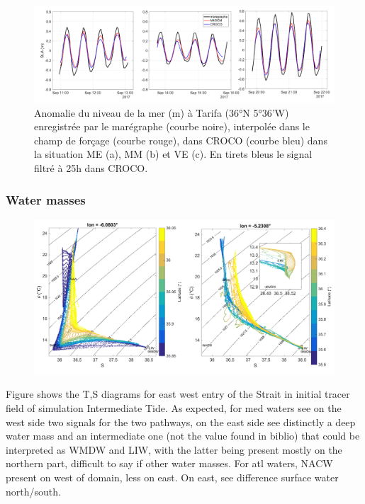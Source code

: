 \begin{figure}[!h]
        \includegraphics[width=\textwidth]{./GBR3D/SLA_Tarifa_ME2VE2IES.png}
        \caption{Anomalie du niveau de la mer (m) à Tarifa (36°N 5°36'W) enregistrée par le marégraphe  (courbe noire),
        interpolée dans le champ de forçage (courbe rouge), dans CROCO (courbe bleu) dans la situation ME (a), MM (b) et VE (c).
        En tirets bleus le signal filtré à 25h dans CROCO.}
        \label{fig_maree_tar}
\end{figure}

\subsubsection{Water masses}


\begin{figure}[!h]
        \includegraphics[width=\textwidth]{./GBR3D/WM_ini_IES.png}
        \caption{}
\end{figure}


Figure shows the T,S diagrams for east west entry of the Strait in initial tracer field of simulation Intermediate Tide. As expected, for med waters see on the west side two signals for the two pathways, on the east side see distinctly a deep water mass and an intermediate one (not the value found in biblio) that could be interpreted as WMDW and LIW, with the latter being present mostly on the northern part, difficult to say if other water masses. For atl waters, NACW present on west of domain, less on east. On east, see difference surface water north/south.

